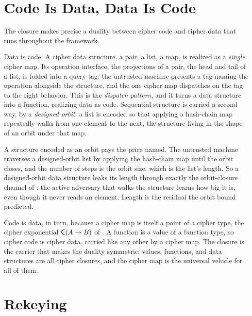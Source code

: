 \section{Code Is Data, Data Is Code}
\label{sec:code-data-duality}

The closure makes precise a duality between cipher code and cipher data that
runs throughout the framework.

Data is code. A cipher data structure, a pair, a list, a map, is realized as
a \emph{single} cipher map. Its operation interface, the projections of a
pair, the head and tail of a list, is folded into a query tag: the untrusted
machine presents a tag naming the operation alongside the structure, and the
one cipher map dispatches on the tag to the right behavior. This is the
\emph{dispatch pattern}, and it turns a data structure into a function,
realizing data as code. Sequential structure is carried a second way, by a
\emph{designed orbit}: a list is encoded so that applying a hash-chain map
repeatedly walks from one element to the next, the structure living in the
shape of an orbit under that map.

\begin{remark}
\label{rem:designed-orbit}
A structure encoded as an orbit pays the price  named.
The untrusted machine traverses a designed-orbit list by applying the
hash-chain map until the orbit closes, and the number of steps is the orbit
size, which is the list's length. So a designed-orbit data structure leaks
its length through exactly the orbit-closure channel of :
the active adversary that walks the structure learns how big it is, even
though it never reads an element. Length is the residual the orbit bound
predicted.
\end{remark}

Code is data, in turn, because a cipher map is itself a point of a cipher
type, the cipher exponential $\mathsf{C}(A \to B)$ of . A
function is a value of a function type, so cipher code is cipher data, carried
like any other by a cipher map. The closure is the carrier that makes the
duality symmetric: values, functions, and data structures are all cipher
closures, and the cipher map is the universal vehicle for all of them.

\section{Rekeying}
\label{sec:rekeying}

